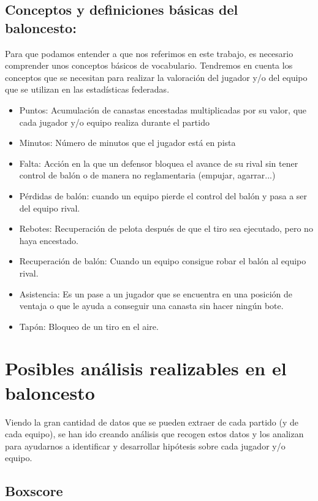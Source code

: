 \documentclass[paper=a4, fontsize=9pt]{article}
\begin{document}
\subsection{Conceptos y definiciones básicas del baloncesto:}

Para que podamos entender a que nos referimos en este trabajo, es necesario comprender unos conceptos básicos de vocabulario. Tendremos en cuenta los conceptos que se necesitan para realizar la valoración del jugador y/o del equipo que se utilizan en las estadísticas federadas.

\begin{itemize}

   \item Puntos: Acumulación de canastas encestadas multiplicadas por su valor, que cada  jugador y/o equipo realiza durante el partido
   \item Minutos: Número de minutos que el jugador está en pista
   \item Falta: Acción en la que un defensor bloquea el avance de su rival sin tener control de balón o de manera no reglamentaria (empujar, agarrar...)
   \item Pérdidas de balón: cuando un equipo pierde el control del balón y pasa a ser del equipo rival.
   \item Rebotes: Recuperación de pelota después de que el tiro sea ejecutado, pero no haya encestado.
   \item Recuperación de balón: Cuando un equipo consigue robar el balón al equipo rival.
   \item Asistencia: Es un pase a un jugador que se encuentra en una posición de ventaja o que le ayuda a conseguir una canasta sin hacer ningún bote.
   \item Tapón: Bloqueo de un tiro en el aire.
   
\end{itemize}


\section{Posibles análisis realizables en el baloncesto}

Viendo la gran cantidad de datos que se pueden extraer de cada partido (y de cada equipo), se han ido creando análisis que recogen estos datos y los analizan para ayudarnos a identificar y desarrollar hipótesis sobre cada jugador y/o equipo.

\subsection{Boxscore}
\end{document}
